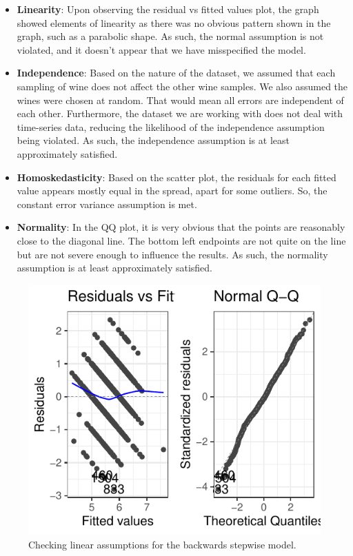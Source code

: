 \documentclass[a4paper,9pt,twocolumn,twoside,]{pinp}
\providecommand{\tightlist}{%
  \setlength{\itemsep}{0pt}\setlength{\parskip}{0pt}}
\begin{document}
\begin{itemize}
\tightlist
\item
  \textbf{Linearity}: Upon observing the residual vs fitted values plot,
  the graph showed elements of linearity as there was no obvious pattern
  shown in the graph, such as a parabolic shape. As such, the normal
  assumption is not violated, and it doesn't appear that we have
  misspecified the model.
\item
  \textbf{Independence}: Based on the nature of the dataset, we assumed
  that each sampling of wine does not affect the other wine samples. We
  also assumed the wines were chosen at random. That would mean all
  errors are independent of each other. Furthermore, the dataset we are
  working with does not deal with time-series data, reducing the
  likelihood of the independence assumption being violated. As such, the
  independence assumption is at least approximately satisfied.\\
\item
  \textbf{Homoskedasticity}: Based on the scatter plot, the residuals
  for each fitted value appears mostly equal in the spread, apart for
  some outliers. So, the constant error variance assumption is met.
\item
  \textbf{Normality}: In the QQ plot, it is very obvious that the points
  are reasonably close to the diagonal line. The bottom left endpoints
  are not quite on the line but are not severe enough to influence the
  results. As such, the normality assumption is at least approximately
  satisfied.
\end{itemize}

\begin{figure}

{\centering \includegraphics{Executive-Summary_files/figure-latex/unnamed-chunk-3-1} 

}

\caption{Checking linear assumptions for the backwards stepwise model.}\label{fig:unnamed-chunk-3}
\end{figure}
\end{document}
